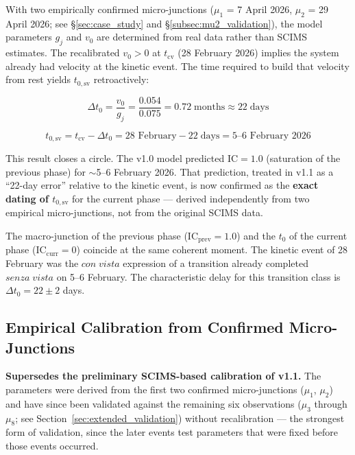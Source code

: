\documentclass[12pt,a4paper]{article}
\newcommand{\gj}{g_j}
\newcommand{\IC}{\mathrm{IC}}
\begin{document}
With two empirically confirmed micro-junctions ($\mu_1$ = 7 April 2026, $\mu_2$ = 29 April 2026; see \S\ref{sec:case_study} and \S\ref{subsec:mu2_validation}), the model parameters $\gj$ and $v_0$ are determined from real data rather than SCIMS estimates. The recalibrated $v_0 > 0$ at $t_{\mathrm{cv}}$ (28 February 2026) implies the system already had velocity at the kinetic event. The time required to build that velocity from rest yields $t_{0,\mathrm{sv}}$ retroactively:

\begin{equation}\label{eq:t0_retro}
\Delta t_0 = \frac{v_0}{\gj} = \frac{0.054}{0.075} = 0.72 \;\text{months} \approx 22 \;\text{days}
\end{equation}

\begin{equation}
t_{0,\mathrm{sv}} = t_{\mathrm{cv}} - \Delta t_0 = \text{28 February} - 22\;\text{days} = \text{5--6 February 2026}
\end{equation}

This result closes a circle. The v1.0 model predicted $\IC = 1.0$ (saturation of the previous phase) for $\sim$5--6 February 2026. That prediction, treated in v1.1 as a ``22-day error'' relative to the kinetic event, is now confirmed as the \textbf{exact dating of $t_{0,\mathrm{sv}}$} for the current phase --- derived independently from two empirical micro-junctions, not from the original SCIMS data.

The macro-junction of the previous phase ($\IC_{\mathrm{prev}} = 1.0$) and the $t_0$ of the current phase ($\IC_{\mathrm{curr}} = 0$) coincide at the same coherent moment. The kinetic event of 28 February was the $con\;vista$ expression of a transition already completed $senza\;vista$ on 5--6 February. The characteristic delay for this transition class is $\Delta t_0 = 22 \pm 2$ days.

\subsection{Empirical Calibration from Confirmed Micro-Junctions}\label{subsec:calibration}

\textbf{Supersedes the preliminary SCIMS-based calibration of v1.1.} The parameters were derived from the first two confirmed micro-junctions ($\mu_1$, $\mu_2$) and have since been validated against the remaining six observations ($\mu_3$ through $\mu_8$; see Section~\ref{sec:extended_validation}) without recalibration --- the strongest form of validation, since the later events test parameters that were fixed before those events occurred.
\end{document}
